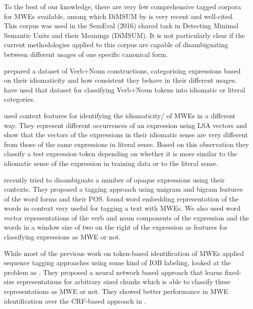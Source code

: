 \documentclass[output=paper,modfonts,nonflat]{langsci/langscibook}
\begin{document}
To the best of our knowledge, there are very few comprehensive tagged corpora for MWEs available, among which DiMSUM by \cite{schneider-dimsum:2016} is very recent and well-cited. This corpus was used in the SemEval (2016) shared task in Detecting Minimal Semantic Units and their Meanings (DiMSUM).
It is not particularly clear if the current methodologies applied to this corpus are capable of disambiguating between different usages of one specific canonical form.


\cite{cook2008vnc} prepared a dataset of  Verb+Noun constructions, categorising expressions based on their idiomaticity and how consistent they behave in their different usages. \cite{fazly-cook-stevenson:2009:CL} have used that dataset for classifying Verb+Noun tokens into idiomatic or literal categories.

\cite{Katz06automaticidentification} used context features for identifying the idiomaticity\// of MWEs in a different way. They represent different occurrences of an expression using LSA vectors and show that the vectors of the expressions in their idiomatic sense are very different from those of the same expressions in literal sense. Based on this observation they classify a test expression token depending on whether it is more similar to the idiomatic sense of the expression in training data or to the literal sense. %

\cite{scholivet-ramisch:2017:MWE2017} recently tried to disambiguate a number of opaque  expressions using their contexts. They proposed a tagging approach using unigram and bigram features of the word forms and their POS.
\cite{Qu+:2015a} found word embedding representation of the words in context very useful for tagging a text with MWEs. We also used word vector representations of the verb and noun components of the expression and the words in a window size of two on the right of the expression as features for classifying expressions as MWE or not. 

While most of the previous work on token-based identification of MWEs applied sequence tagging approaches using some kind of IOB labeling, \cite{legrand2016phrase} looked at the problem as . They proposed a neural network based approach that learns fixed-size representations for arbitrary sized chunks which is able to classify these representations as MWE or not. They showed better performance in MWE identification over the CRF-based approach in \cite{constant2013}.
\end{document}
